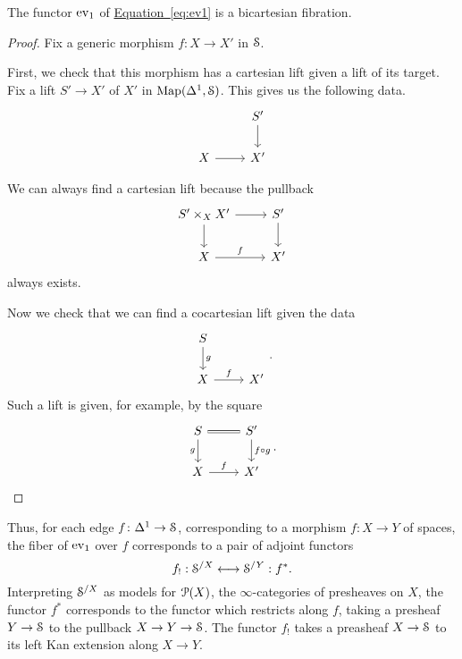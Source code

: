\documentclass[main.tex]{subfiles}
\begin{document}
\begin{corollary}
  The functor $\ev_{1}$ of \hyperref[eq:ev1]{Equation~\ref*{eq:ev1}} is a bicartesian fibration.
\end{corollary}
\begin{proof}
  Fix a generic morphism $f\colon X \to X'$ in $\S$.

  First, we check that this morphism has a cartesian lift given a lift of its target. Fix a lift $S' \to X'$ of $X'$ in $\Map(\Delta^{1}, \S)$. This gives us the following data.
  \begin{equation*}
    \begin{tikzcd}
      & S'
      \arrow[d]
      \\
      X
      \arrow[r]
      & X'
    \end{tikzcd}
  \end{equation*}

  We can always find a cartesian lift because the pullback
  \begin{equation*}
    \begin{tikzcd}
      S' \times_{X} X'
      \arrow[r]
      \arrow[d]
      & S'
      \arrow[d]
      \\
      X
      \arrow[r, "f"]
      & X'
    \end{tikzcd}
  \end{equation*}
  always exists.

  Now we check that we can find a cocartesian lift given the data
  \begin{equation*}
    \begin{tikzcd}
      S
      \arrow[d, "g"]
      \\
      X
      \arrow[r, "f"]
      & X'
    \end{tikzcd}.
  \end{equation*}
  Such a lift is given, for example, by the square
  \begin{equation*}
    \begin{tikzcd}
      S
      \arrow[d, swap, "g"]
      \arrow[r, equals]
      & S'
      \arrow[d, "f \circ g"]
      \\
      X
      \arrow[r, "f"]
      & X'
    \end{tikzcd}.\qedhere
  \end{equation*}
\end{proof}

Thus, for each edge $f\colon \Delta^{1} \to \S$, corresponding to a morphism $f\colon X \to Y$ of spaces, the fiber of $\ev_{1}$ over $f$ corresponds to a pair of adjoint functors
\begin{equation*}
  f_{!} : \S^{/X} \longleftrightarrow \S^{/Y} : f^{*}.
\end{equation*}
Interpreting $\S^{/X}$ as models for $\P(X)$, the $\infty$-categories of presheaves on $X$, the functor $f^{*}$ corresponds to the functor which restricts along $f$, taking a presheaf $Y \to \S$ to the pullback $X \to Y \to \S$. The functor $f_{!}$ takes a preasheaf $X \to \S$ to its left Kan extension along $X \to Y$.
\end{document}
